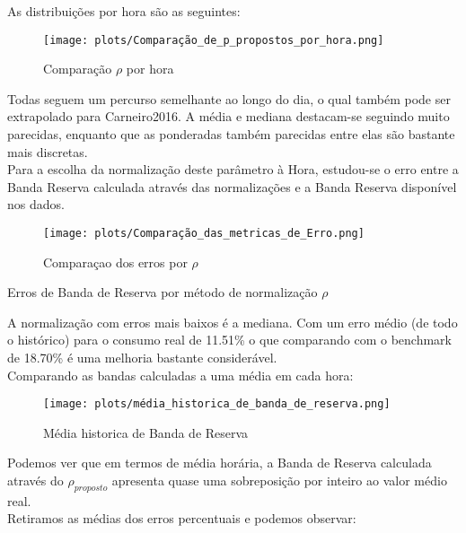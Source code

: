As distribuições por hora são as seguintes:

\begin{figure}[H]
    \centering
    \texttt{[image: plots/Comparação\_de\_p\_propostos\_por\_hora.png]}
    \caption{Comparação $\rho$ por hora}
\end{figure}

Todas seguem um percurso semelhante ao longo do dia, o qual também pode ser extrapolado para Carneiro2016. A média e mediana destacam-se seguindo muito parecidas, enquanto que as ponderadas também parecidas entre elas são bastante mais discretas. \\
Para a escolha da normalização deste parâmetro à Hora, estudou-se o erro entre a Banda Reserva calculada através das normalizações e a Banda Reserva disponível nos dados. \\


\begin{figure}[H]
    \centering
    \texttt{[image: plots/Comparação\_das\_metricas\_de\_Erro.png]}
    \caption{Comparaçao dos erros por $\rho$}
\end{figure}


\begin{table}[H]
    \caption{Erros de Banda de Reserva por método de normalização $\rho$}    
    \resizebox{\linewidth}{!}{}
    \end{table}


A normalização com erros mais baixos é a mediana. Com um erro médio (de todo o histórico) para o consumo real de 11.51\% o que comparando com o benchmark de 18.70\% é uma melhoria  bastante considerável. \\
Comparando as bandas calculadas a uma média em cada hora: \\


\begin{figure}[H]
    \centering
    \texttt{[image: plots/média\_historica\_de\_banda\_de\_reserva.png]}
    \caption{Média historica de Banda de Reserva}
\end{figure}

Podemos ver que em termos de média horária, a Banda de Reserva calculada através do $\rho_{proposto}$ apresenta quase uma sobreposição por inteiro ao valor médio real. \\

Retiramos as médias dos erros percentuais e podemos observar: \\

